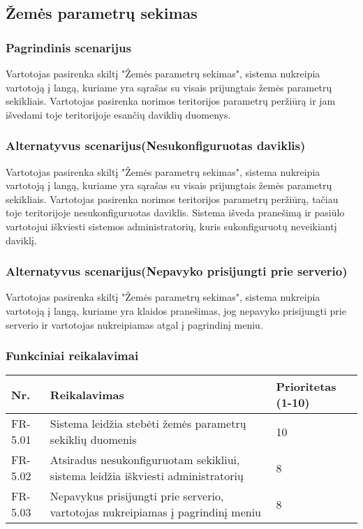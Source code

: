 \documentclass[oneside]{VUMIFPSkursinis}
\begin{document}
\subsection{Žemės parametrų sekimas}
\subsubsection{Pagrindinis scenarijus}
	Vartotojas pasirenka skiltį "Žemės parametrų sekimas", sistema nukreipia vartotoją į langą, kuriame yra sąrašas su visais prijungtais žemės parametrų sekikliais. Vartotojas pasirenka norimos teritorijos parametrų peržiūrą ir jam išvedami toje teritorijoje esančių daviklių duomenys.
\subsubsection{Alternatyvus scenarijus(Nesukonfiguruotas daviklis)}
	Vartotojas pasirenka skiltį "Žemės parametrų sekimas", sistema nukreipia vartotoją į langą, kuriame yra sąrašas su visais prijungtais žemės parametrų sekikliais. Vartotojas pasirenka norimos teritorijos parametrų peržiūrą, tačiau toje teritorijoje nesukonfiguruotas daviklis. Sistema išveda pranešimą ir pasiūlo vartotojui iškviesti sistemos administratorių, kuris sukonfiguruotų neveikiantį daviklį.
\subsubsection{Alternatyvus scenarijus(Nepavyko prisijungti prie serverio)}
	Vartotojas pasirenka skiltį "Žemės parametrų sekimas", sistema nukreipia vartotoją į langą, kuriame yra klaidos pranešimas, jog nepavyko prisijungti prie serverio ir vartotojas nukreipiamas atgal į pagrindinį meniu.
\subsubsection{Funkciniai reikalavimai}
\begin{table}[htbp]
	\begin{tabularx}{1\textwidth}{ |P{2.5cm}|X|P{3cm }| }  \hline
           	Nr. & Reikalavimas &  Prioritetas (1-10)  \\   \hline 
         		FR-5.01 & Sistema leidžia stebėti žemės parametrų sekiklių duomenis & 10  \\   \hline
			FR-5.02 & Atsiradus nesukonfiguruotam sekikliui, sistema leidžia iškviesti administratorių & 8 \\  \hline
			FR-5.03 & Nepavykus prisijungti prie serverio, vartotojas nukreipiamas į pagrindinį meniu & 8 \\ \hline
	\end{tabularx}
\end{table}
\end{document}
